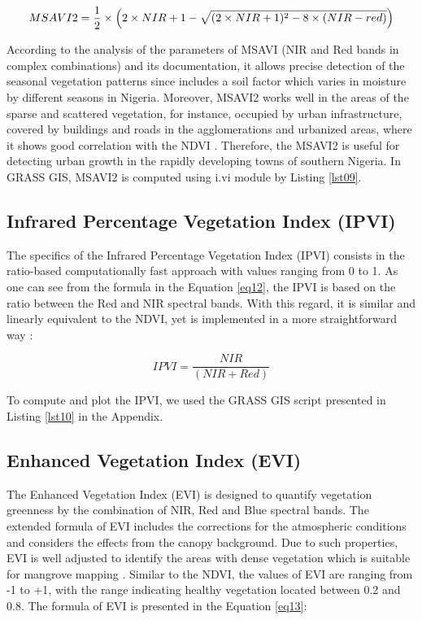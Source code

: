 \documentclass[jmse,article,submit,pdftex,moreauthors]{Definitions/mdpi}
\begin{document}
\begin{equation}\label{eq11}
	MSAVI2 = \frac{1}{2} \times \Bigl(2 \times NIR+1-\sqrt{(2 \times NIR+1)^2-8 \times (NIR-red)}\Bigr)
\end{equation} 

According to the analysis of the parameters of MSAVI (NIR and Red bands in complex combinations) and its documentation, it allows precise detection of the seasonal vegetation patterns since includes a soil factor which varies in moisture by different seasons in Nigeria. Moreover, MSAVI2 works well in the areas of the sparse and scattered vegetation, for instance, occupied by urban infrastructure, covered by buildings and roads in the agglomerations and urbanized areas, where it shows good correlation with the NDVI \cite{FABIJANCZYK2022100721}. Therefore, the MSAVI2 is useful for detecting urban growth in the rapidly developing towns of southern Nigeria. In GRASS GIS, MSAVI2 is computed using i.vi module by Listing \ref{lst09}.

\subsection{Infrared Percentage Vegetation Index (IPVI)}

The specifics of the Infrared Percentage Vegetation Index (IPVI) consists in the ratio-based computationally fast approach with values ranging from 0 to 1. As one can see from the formula in the Equation \ref{eq12}, the IPVI is based on the ratio between the Red and NIR spectral bands. With this regard, it is similar and linearly equivalent to the NDVI, yet is implemented in a more straightforward way \cite{CRIPPEN199071}:

\begin{equation}\label{eq12}
	IPVI = \frac{NIR}{(NIR+Red)}
\end{equation} 

To compute and plot the IPVI, we used the GRASS GIS script presented in Listing \ref{lst10} in the Appendix.

\subsection{Enhanced Vegetation Index (EVI)}

The Enhanced Vegetation Index (EVI) is designed to quantify vegetation greenness by the combination of NIR, Red and Blue spectral bands. The extended formula of EVI includes the corrections for the atmospheric conditions and considers the effects from the canopy background. Due to such properties, EVI is well adjusted to identify the areas with dense vegetation which is suitable for mangrove mapping \cite{HUETE2002195}. Similar to the NDVI, the values of EVI are ranging from -1 to +1, with the range indicating healthy vegetation located between 0.2 and 0.8. The formula of EVI is presented in the Equation \ref{eq13}:
\end{document}
